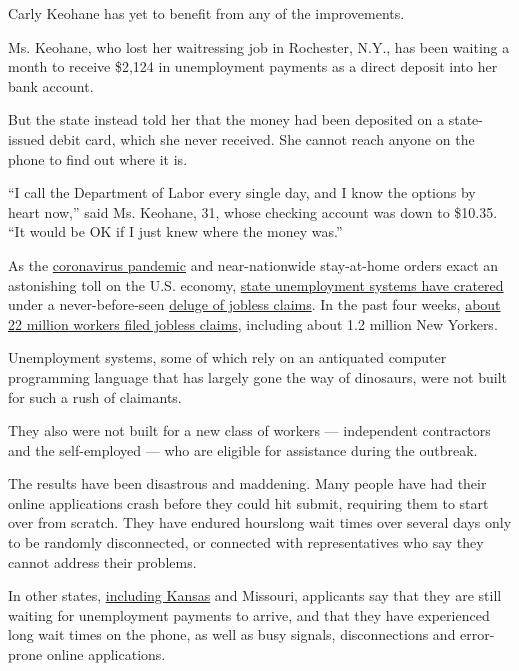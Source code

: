 Carly Keohane has yet to benefit from any of the improvements.

Ms. Keohane, who lost her waitressing job in Rochester, N.Y., has been
waiting a month to receive \$2,124 in unemployment payments as a direct
deposit into her bank account.

But the state instead told her that the money had been deposited on a
state-issued debit card, which she never received. She cannot reach
anyone on the phone to find out where it is.

``I call the Department of Labor every single day, and I know the
options by heart now,'' said Ms. Keohane, 31, whose checking account was
down to \$10.35. ``It would be OK if I just knew where the money was.''

As the
\href{https://www.nytimes3xbfgragh.onion/2020/04/15/nyregion/coronavirus-face-masks-andrew-cuomo.html}{coronavirus
pandemic} and near-nationwide stay-at-home orders exact an astonishing
toll on the U.S. economy,
\href{https://www.nytimes3xbfgragh.onion/2020/04/04/nyregion/coronavirus-ny-unemployment-benefits.html}{state
unemployment systems have cratered} under a never-before-seen
\href{https://www.nytimes3xbfgragh.onion/2020/04/02/business/economy/coronavirus-unemployment-claims.html}{deluge
of jobless claims}. In the past four weeks,
\href{https://www.nytimes3xbfgragh.onion/2020/04/16/business/economy/unemployment-numbers-coronavirus.html}{about
22 million workers filed jobless claims}, including about 1.2 million
New Yorkers.

Unemployment systems, some of which rely on an antiquated computer
programming language that has largely gone the way of dinosaurs, were
not built for such a rush of claimants.

They also were not built for a new class of workers --- independent
contractors and the self-employed --- who are eligible for assistance
during the outbreak.

The results have been disastrous and maddening. Many people have had
their online applications crash before they could hit submit, requiring
them to start over from scratch. They have endured hourslong wait times
over several days only to be randomly disconnected, or connected with
representatives who say they cannot address their problems.

In other states,
\href{https://www.kansascity.com/news/local/article242013491.html}{including
Kansas} and Missouri, applicants say that they are still waiting for
unemployment payments to arrive, and that they have experienced long
wait times on the phone, as well as busy signals, disconnections and
error-prone online applications.

